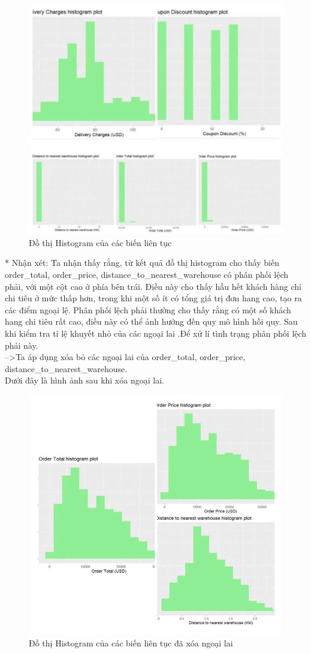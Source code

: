 \begin{figure}[H]
    \centering
    \includegraphics[width=0.7\linewidth]{graphics/bang7.jpg}
    \caption{Đồ thị Histogram của các biến liên tục}
  
\end{figure}
* Nhận xét: Ta nhận thấy rằng, từ kết quả đồ thị histogram cho thấy biến order\_total, order\_price, distance\_to\_nearest\_warehouse có phân phối lệch phải, với một cột cao ở phía bên trái. Điều này cho thấy hầu hết khách hàng chỉ chi tiêu ở mức thấp hơn, trong khi một số ít có tổng giá trị đơn hang cao, tạo ra các điểm ngoại lệ. Phân phối lệch phải thường cho thấy  rằng có một số khách hang chi tiêu rất cao, điều này có thể ảnh hưởng đến quy mô hình hồi quy. Sau khi kiểm tra tỉ lệ khuyết nhỏ của các ngoại lai .Để xử lí tình trạng phân phối lệch phải này.\\
 -->Ta áp dụng xóa bỏ các ngoại lai  của order\_total, order\_price, distance\_to\_nearest\_warehouse.\\
 Dưới đây là hình ảnh sau khi xóa ngoại lai.
 \begin{figure}[H]
    \centering
    \includegraphics[width=0.7\linewidth]{graphics/bang8.jpg}
    \caption{Đồ thị Histogram của các biến liên tục đã xóa ngoại lai}
    
\end{figure}

